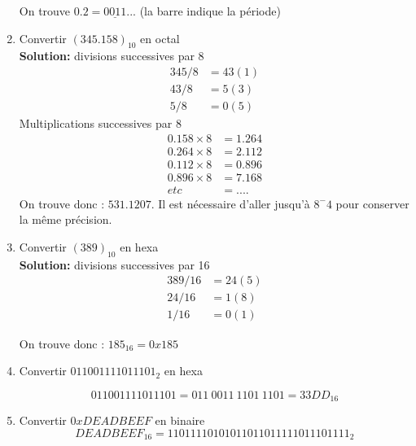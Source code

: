 \documentclass[a4paper,11pt]{article}
\begin{document}
\begin{enumerate}
On trouve $0.2=\underline{0011}...$ (la barre indique la période)

\item Convertir $(345.158 )_{10}$ en octal\\
{\bf Solution:} divisions successives par 8
\begin{align}
  345 / 8 &= 43 (1) \nonumber \\
  43  / 8 &= 5  (3) \nonumber \\
   5  / 8 &= 0  (5)
\end{align}
 Multiplications successives par 8
\begin{align}
  0.158 \times 8 &= 1.264 \nonumber \\
  0.264 \times 8 &= 2.112 \nonumber \\
  0.112 \times 8 &= 0.896 \nonumber \\
  0.896 \times 8 &= 7.168 \nonumber \\
  etc &=....
\end{align}
On trouve  donc : $531.1207$. Il est nécessaire d'aller jusqu'à $8^-4$ pour conserver la même précision.


\item Convertir $(389)_{10}$ en hexa\\
{\bf Solution:} divisions successives par 16
\begin{align}
  389 / 16 &= 24 (5) \nonumber \\
   24  /16 &= 1  (8) \nonumber \\
   1  / 16 &= 0  (1)
\end{align}

On trouve donc : $185_{16}=0x185$

\item { Convertir $011001111011101_2$ en hexa}

\begin{equation}
  011001111011101=011\ 0011\ 1101\ 1101=33DD_{16}
\end{equation}

\item { Convertir $0xDEADBEEF$ en binaire}
$$DEADBEEF_{16}=11011110101011011011111011101111_2$$




\end{enumerate}
\end{document}
